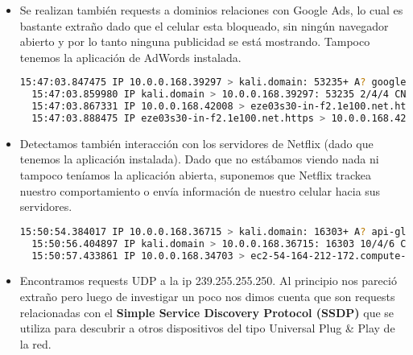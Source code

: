 \begin{itemize}
\item Se realizan también requests a dominios relaciones con Google Ads, lo cual es bastante extraño dado que el celular esta bloqueado, 
sin ningún navegador abierto y por lo tanto ninguna publicidad se está mostrando. Tampoco tenemos la aplicación de AdWords instalada.

\begin{lstlisting}[language=bash]
  15:47:03.847475 IP 10.0.0.168.39297 > kali.domain: 53235+ A? googleads.g.doubleclick.net. (45)
  15:47:03.859980 IP kali.domain > 10.0.0.168.39297: 53235 2/4/4 CNAME pagead46.l.doubleclick.net., A 172.217.28.194 (232)
  15:47:03.867331 IP 10.0.0.168.42008 > eze03s30-in-f2.1e100.net.https: Flags [S], seq 964055324, win 65535, options [mss 1460,sackOK,TS val 39170190 ecr 0,nop,wscale 8], length 0
  15:47:03.888475 IP eze03s30-in-f2.1e100.net.https > 10.0.0.168.42008: Flags [S.], seq 2016752776, ack 964055325, win 64240, options [mss 1460], length 0
\end{lstlisting}

\item Detectamos también interacción con los servidores de Netflix (dado que tenemos la aplicación instalada). Dado que no estábamos 
viendo nada ni tampoco teníamos la aplicación abierta, suponemos que Netflix trackea nuestro comportamiento o envía información de 
nuestro celular hacia sus servidores.

\begin{lstlisting}[language=bash]
  15:50:54.384017 IP 10.0.0.168.36715 > kali.domain: 16303+ A? api-global.netflix.com. (40)
  15:50:56.404897 IP kali.domain > 10.0.0.168.36715: 16303 10/4/6 CNAME api-global.geo.netflix.com., CNAME api-global.us-east-1-sa.prodaa.netflix.com., A 54.164.212.172, A 54.164.49.61, A 54.173.178.127, A 54.210.30.204, A 54.164.207.213, A 54.173.250.49, A 54.164.216.123, A 54.152.71.86 (499)
  15:50:57.433861 IP 10.0.0.168.34703 > ec2-54-164-212-172.compute-1.amazonaws.com.https: Flags [S], seq 4072206306, win 65535, options [mss 1460,sackOK,TS val 39227017 ecr 0,nop,wscale 8], length 0
\end{lstlisting}

\item Encontramos requests UDP a la ip 239.255.255.250. Al principio nos pareció extraño pero luego de investigar un poco nos dimos cuenta 
que son requests relacionadas con el \textbf{Simple Service Discovery Protocol (SSDP)} que se utiliza para descubrir a otros dispositivos 
del tipo Universal Plug & Play de la red.


\end{itemize}
